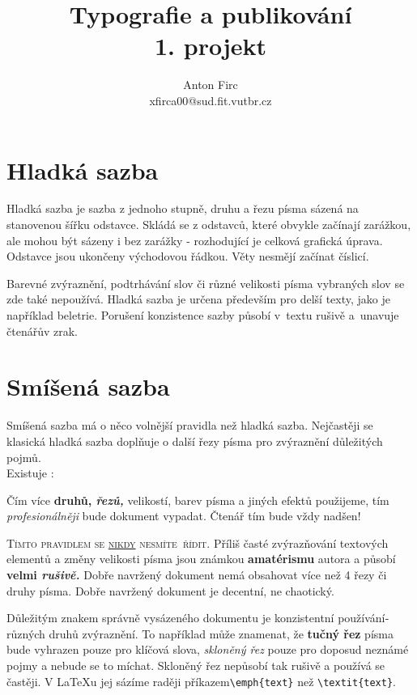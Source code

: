 \documentclass[a4paper, 11pt]{article}
\title{Typografie a publikování \\ 1. projekt}
\author{Anton Firc\\xfirca00@sud.fit.vutbr.cz}
\date{}
\begin{document}
\sloppy
\twocolumn[\maketitle]
\section{Hladká sazba}
\noindent Hladká sazba je sazba z jednoho stupně, druhu a řezu pí­sma sázená na stanovenou šířku odstavce. Skládá se z odstavců, které obvykle začínají­ zarážkou, ale mohou být sázeny i bez zarážky - rozhodují­cí­ je celková grafická úprava. Odstavce jsou ukončeny východovou řádkou. Věty nesmějí začínat číslicí.

Barevné zvýraznění­, podtrhávání­ slov či různé velikosti písma vybraných slov se zde také nepoužívá. Hladká sazba je určena především pro delší­ texty, jako je napří­klad beletrie. Porušení­ konzistence sazby působí v~textu rušivě a~unavuje čtenářův zrak.

\section{Smíšená sazba} 

\noindent Smíšená sazba má o něco volnější­ pravidla než hladká sazba. Nejčastěji se klasická hladká sazba doplňuje o další řezy pí­sma pro zvýraznění­ důležitých pojmů.\\ Existuje :

\vspace{4mm}
\parbox{0.81\linewidth}{
    \hspace{4mm} Čí­m ví­ce {\bf druhů, \itshape řezů,}  {\scriptsize velikostí}, barev pí­sma a jiných efektů použijeme, tí­m {\itshape profesionálněji} bude  dokument vypadat. Čtenář tím bude vždy {\Huge nadšen!}}
\vspace{4mm}

{\scshape Tí­mto pravidlem se \underline{nikdy} nesmí­te~ří­dit.} Příliš časté zvýrazňování textových elementů a změny velikosti {\tiny písma} jsou {\huge známkou \bf amatérismu} autora a působí­ {\bf velmi \it rušivě.} Dobře navržený dokument nemá obsahovat ví­ce než 4 řezy či druhy pí­sma. {\ttfamily Dobře navržený dokument je decent\-ní, ne chaotický.}

Důležitým znakem správně vysázeného dokumentu je konzistentní použí­vání­ různých druhů zvýraznění­. To napří­klad může znamenat, že {\bf tučný řez} pí­sma bude vyhrazen pouze pro klíčová slova, {\slshape skloněný řez} pouze pro doposud neznámé pojmy a nebude se to míchat. Skloněný řez nepůsobí­ tak rušivě a použí­vá se častěji. V \LaTeX u jej sází­me raději příkazem\verb|\emph{text}| než \verb|\textit{text}|.
\end{document}
